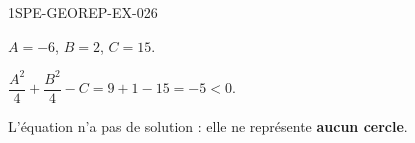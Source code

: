 \begin{corrige}{1SPE-GEOREP-EX-026}

$A = -6$, $B = 2$, $C = 15$.

$\dfrac{A^2}{4} + \dfrac{B^2}{4} - C = 9 + 1 - 15 = -5 < 0$.

L'équation n'a pas de solution : elle ne représente \textbf{aucun cercle}.

\end{corrige}
